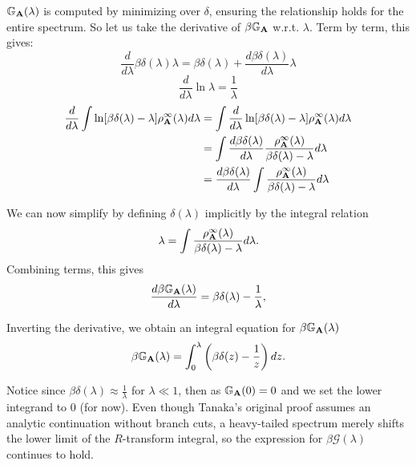 $\mathbb{G}_{\mathbf{A}}(\lambda)$ is computed by minimizing over $\delta$, ensuring the relationship holds for the entire spectrum.
So let us take the derivative of $\beta\mathbb{G}_{\mathbf{A}}$ w.r.t. $\lambda$. 
Term by term, this gives:
\begin{equation}
\dfrac{d}{d\lambda} \beta\delta(\lambda)\lambda = \beta\delta(\lambda) + \dfrac{d \beta\delta(\lambda)}{d\lambda} \lambda
\end{equation}
\begin{equation}
\dfrac{d}{d\lambda} \ln\lambda = \dfrac{1}{\lambda}
\end{equation}
\begin{align}
\dfrac{d}{d\lambda} \int \ln[\beta\delta(\lambda) - \lambda] \rho^{\infty}_{\mathbf{A}}(\lambda) d\lambda
&= \int \dfrac{d}{d\lambda} \ln[\beta\delta(\lambda) - \lambda] \rho^{\infty}_{\mathbf{A}}(\lambda) d\lambda \\ \nonumber
&= \int \dfrac{d \beta\delta(\lambda)}{d\lambda}\dfrac{ \rho^{\infty}_{\mathbf{A}}(\lambda)}{\beta\delta(\lambda) - \lambda}d\lambda  \\ \nonumber
&=  \dfrac{d \beta\delta(\lambda)}{d\lambda}\int\dfrac{ \rho^{\infty}_{\mathbf{A}}(\lambda)}{\beta\delta(\lambda) - \lambda}d\lambda
\end{align}

We can now simplify by defining $\delta(\lambda)$ implicitly by the integral relation
\begin{equation}
\lambda = \int \frac{\rho^{\infty}_{\mathbf{A}}(\lambda)}{\beta\delta(\lambda) - \lambda} d\lambda.
\end{equation}
Combining terms, this gives
\begin{equation}
\frac{d\beta\mathbb{G}_{\mathbf{A}}(\lambda)}{d\lambda} = \beta\delta(\lambda) - \frac{1}{\lambda},
\end{equation}

 Inverting the derivative, we obtain an integral equation for $\beta\mathbb{G}_{\mathbf{A}}(\lambda)$ 
\begin{equation}
\beta\mathbb{G}_{\mathbf{A}}(\lambda) = \int_0^\lambda \left(\beta\delta(z) - \frac{1}{z}\right) dz.
\end{equation}

Notice since  $\beta\delta(\lambda) \approx \frac{1}{\lambda}$ for $\lambda \ll 1$, then
as $\mathbb{G}_{\mathbf{A}}(0) = 0$ and we set the lower integrand to $0$ (for now).  Even though Tanaka’s original proof assumes an analytic continuation without branch cuts, a heavy-tailed spectrum merely shifts the lower limit of the $R$-transform integral, so the expression for $\beta\mathcal G(\lambda)$ continues to hold.


